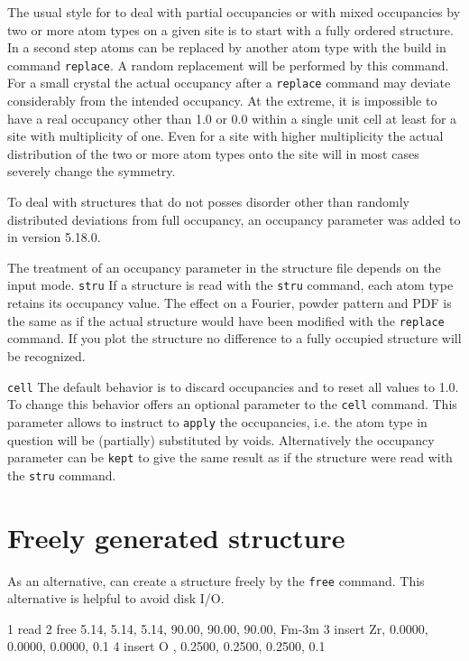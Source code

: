 The usual style for \Discus to deal with partial occupancies or
with mixed occupancies by two or more atom types on a given site is
to start with a fully ordered structure. In a second step atoms 
can be replaced by another atom type with the build in command
{\tt replace}. A random replacement will be performed by this 
command. For a small crystal the actual occupancy after a {\tt replace} 
command may deviate considerably from the intended occupancy. 
At the extreme, it is impossible to have a real occupancy other than
1.0 or 0.0 within a single unit cell at least for a site with 
multiplicity of one. Even for a site with higher multiplicity the actual 
distribution of the two or more atom types onto the site will in most cases 
severely change the symmetry. 

To deal with structures that do not posses disorder other than randomly
distributed deviations from full occupancy, an occupancy parameter was
added to \Discus in version 5.18.0. 

The treatment of an occupancy parameter in the structure file
depends on the input mode. 
{\tt stru} If a structure is read with the {\tt stru} command, each
atom type retains its occupancy value. The effect on a Fourier, 
powder pattern and PDF is the same as if the actual structure would
have been modified with the {\tt replace} command. If you plot the 
structure no difference to a fully occupied structure will be 
recognized.

{\tt cell} The default behavior is to discard occupancies and to 
reset all values to 1.0. To change this behavior \Discus offers
an optional parameter to the {\tt cell} command. This parameter
allows to instruct \Discus to {\tt apply} the occupancies, i.e.
the atom type in question will be (partially) substituted by voids.
Alternatively the occupancy parameter can be {\tt kept} to give
the same result as if the structure were read with the {\tt stru}
command.

\section{Freely generated structure      \label{struc-free}}

As an alternative, \Discus can create a structure freely by the
{\tt free} command. This alternative is helpful to avoid 
disk I/O.

\begin{MacVerbatim}
    1  read
    2  free    5.14,  5.14,  5.14,  90.00, 90.00, 90.00, Fm-3m
    3  insert  Zr, 0.0000, 0.0000,  0.0000,  0.1
    4  insert  O , 0.2500, 0.2500,  0.2500,  0.1
\end{MacVerbatim}

